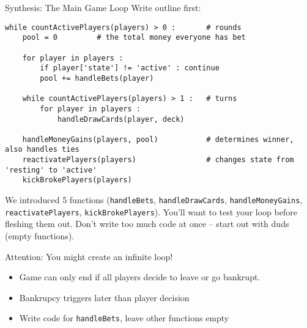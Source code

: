 \begin{frame}[fragile]{Synthesis: The Main Game Loop}
%
Write outline first:
%
\begin{codebox}
\begin{verbatim}
while countActivePlayers(players) > 0 :       # rounds
    pool = 0         # the total money everyone has bet
    
    for player in players :
        if player['state'] != 'active' : continue
        pool += handleBets(player)
    
    while countActivePlayers(players) > 1 :   # turns
        for player in players :
            handleDrawCards(player, deck)
    
    handleMoneyGains(players, pool)           # determines winner, also handles ties
    reactivatePlayers(players)                # changes state from 'resting' to 'active'
    kickBrokePlayers(players)
\end{verbatim}
\end{codebox}
%
\end{frame}


\begin{frame}
%
\begin{hintbox}
We introduced 5 functions (\texttt{handleBets}, \texttt{handleDrawCards}, \texttt{handleMoneyGains}, \texttt{reactivatePlayers}, \texttt{kickBrokePlayers}). You'll want to test your loop before fleshing them out. Don't write too much code at once -- start out with duds (empty functions).

Attention: You might create an infinite loop!
\end{hintbox}
%
\begin{itemize}
\item Game can only end if all players decide to leave or go bankrupt.
\item Bankrupcy triggers later than player decision
\item[\Thus] Write code for \texttt{handleBets}, leave other functions empty
\end{itemize}
%
\end{frame}



